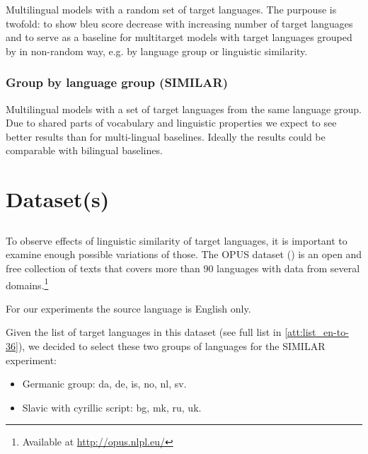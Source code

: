Multilingual models with a random set of target languages.
The purpouse is twofold: 
to show \acrshort{bleu} score decrease with increasing number of target languages and
to serve as a baseline for multitarget models with target languages grouped by
in non-random way, e.g. by language group or linguistic similarity.


\subsubsection*{Group by language group (SIMILAR)}

Multilingual models with a set of target languages from the same language group.
Due to shared parts of vocabulary and linguistic properties we expect to
see better results than for multi-lingual baselines.
Ideally the results could be comparable with bilingual baselines.


% 


\section{Dataset(s)}
\label{section:datasets}


\subsection{}
\label{subsection:en-to-36}

To observe effects of linguistic similarity of target languages,
it is important to examine enough possible variations of those.
The OPUS dataset (\cite{TIEDEMANN12.463}) is an open and free collection of texts
that covers more than 90 languages with data from several
domains.\footnote{Available at \url{http://opus.nlpl.eu/}} 

For our experiments the source language is English only.

Given the list of target languages in this dataset (see full list in \cref{att:list_en-to-36}),
we decided to select these two groups of languages for the SIMILAR experiment:
\begin{itemize}
	\item Germanic group: da, de, is, no, nl, sv.
	\item Slavic with cyrillic script: bg, mk, ru, uk.
\end{itemize}

